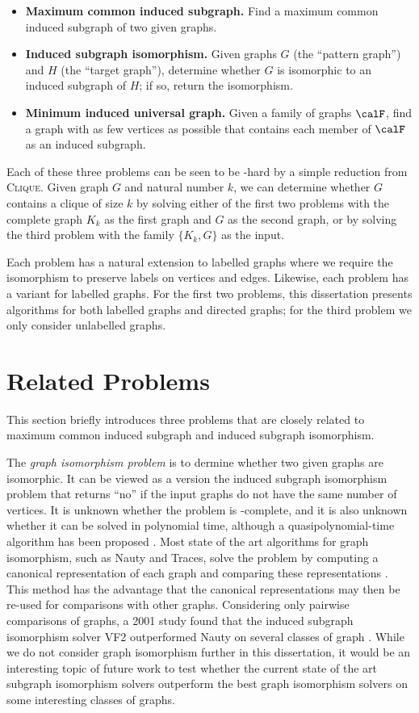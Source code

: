 \begin{itemize}
    \item \textbf{Maximum common induced subgraph.} Find
a maximum common induced subgraph of two given graphs.
    \item \textbf{Induced subgraph isomorphism.} Given graphs $G$ (the ``pattern graph'')
    and $H$ (the ``target graph''),
determine whether $G$ is isomorphic to an induced subgraph of $H$;
if so, return the isomorphism.
    \item \textbf{Minimum induced universal graph.} Given a family of graphs $\calF$,
find a graph with as few vertices as possible that contains each member of $\calF$
as an induced subgraph.
\end{itemize}

Each
of these three problems can be seen to be \NP-hard by a simple reduction from
\textsc{Clique}.
Given graph $G$ and natural number $k$, we can determine whether $G$ contains a clique
of size $k$ by solving either of the first two problems with the complete graph $K_k$ as
the first graph and $G$ as the second graph, or by solving the third problem with the family
$\{K_k, G\}$ as the input.

Each problem has a natural extension to labelled graphs
where we require the isomorphism to preserve labels on vertices and edges.
Likewise, each problem has a variant for labelled graphs.
For the first two problems, this dissertation presents algorithms for both
labelled graphs and directed graphs; for the third problem we only consider
unlabelled graphs.

\section{Related Problems}\label{sec:related-problems}

This section briefly introduces three problems that are closely related to
maximum common induced subgraph and induced subgraph isomorphism.

The \emph{graph isomorphism problem} is to dermine whether two given graphs are
isomorphic. It can be viewed as a version the induced subgraph isomorphism
problem that returns ``no'' if the input graphs do not have the same number of
vertices.  It is unknown whether the problem is \NP-complete, and it is also
unknown whether it can be solved in polynomial time, although a
quasipolynomial-time algorithm has been proposed
\citep{DBLP:conf/stoc/Babai16}.  Most state of the art algorithms for graph
isomorphism, such as Nauty and Traces, solve the problem by computing a
canonical representation of each graph and comparing these representations
\citep{McKay201494}.  This method has the advantage that the canonical
representations may then be re-used for comparisons with other graphs.
Considering only pairwise comparisons of graphs, a 2001 study found that the
induced subgraph isomorphism solver VF2 outperformed Nauty on several classes
of graph \citep{foggia2001performance}.  While we do not consider graph
isomorphism further in this dissertation, it would be an interesting topic of
future work to test whether the current state of the art subgraph isomorphism
solvers outperform the best graph isomorphism solvers on some interesting
classes of graphs.

